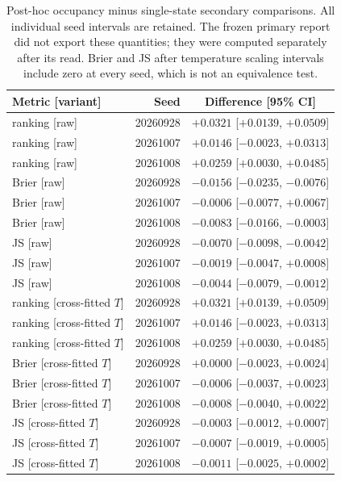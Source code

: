 \documentclass[10pt,a4paper]{article}
\begin{document}
\begin{table}[!htbp]
\centering
\caption{Post-hoc occupancy minus single-state secondary comparisons. All individual seed intervals are retained. The frozen primary report did not export these quantities; they were computed separately after its read. Brier and JS after temperature scaling intervals include zero at every seed, which is not an equivalence test.}
\label{tab:aflabelposthoc}
\small\setlength{\tabcolsep}{4pt}
\begin{tabular}{@{}lrc@{}}
\toprule
Metric [variant] & Seed & Difference [95\% CI] \\
\midrule
ranking [raw] & 20260928 & $+0.0321$ [$+0.0139$, $+0.0509$] \\
ranking [raw] & 20261007 & $+0.0146$ [$-0.0023$, $+0.0313$] \\
ranking [raw] & 20261008 & $+0.0259$ [$+0.0030$, $+0.0485$] \\
Brier [raw] & 20260928 & $-0.0156$ [$-0.0235$, $-0.0076$] \\
Brier [raw] & 20261007 & $-0.0006$ [$-0.0077$, $+0.0067$] \\
Brier [raw] & 20261008 & $-0.0083$ [$-0.0166$, $-0.0003$] \\
JS [raw] & 20260928 & $-0.0070$ [$-0.0098$, $-0.0042$] \\
JS [raw] & 20261007 & $-0.0019$ [$-0.0047$, $+0.0008$] \\
JS [raw] & 20261008 & $-0.0044$ [$-0.0079$, $-0.0012$] \\
ranking [cross-fitted $T$] & 20260928 & $+0.0321$ [$+0.0139$, $+0.0509$] \\
ranking [cross-fitted $T$] & 20261007 & $+0.0146$ [$-0.0023$, $+0.0313$] \\
ranking [cross-fitted $T$] & 20261008 & $+0.0259$ [$+0.0030$, $+0.0485$] \\
Brier [cross-fitted $T$] & 20260928 & $+0.0000$ [$-0.0023$, $+0.0024$] \\
Brier [cross-fitted $T$] & 20261007 & $-0.0006$ [$-0.0037$, $+0.0023$] \\
Brier [cross-fitted $T$] & 20261008 & $-0.0008$ [$-0.0040$, $+0.0022$] \\
JS [cross-fitted $T$] & 20260928 & $-0.0003$ [$-0.0012$, $+0.0007$] \\
JS [cross-fitted $T$] & 20261007 & $-0.0007$ [$-0.0019$, $+0.0005$] \\
JS [cross-fitted $T$] & 20261008 & $-0.0011$ [$-0.0025$, $+0.0002$] \\
\bottomrule
\end{tabular}
\end{table}
\end{document}
